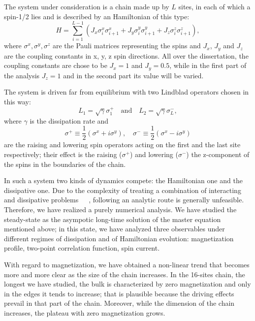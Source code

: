 \documentclass[12pt]{extarticle}
\begin{document}
The system under consideration is a chain made up by $L$ sites, in each of which a spin-1/2 lies and is described by an Hamiltonian of this type:
\begin{equation*}
    H = \sum_{i = 1}^{L-1} (J_x\sigma_i^x\sigma_{i+1}^x + J_y\sigma_i^y \sigma_{i+1}^y + J_z \sigma_i^z \sigma_{i+1}^z),
\end{equation*}
where $\sigma^x, \sigma^y, \sigma^z$ are the Pauli matrices representing the spins and $J_x$, $J_y$ and $J_z$ are the coupling constants in x, y, z spin directions. All over the dissertation, the coupling constants are chose to be $J_x = 1$ and $J_y = 0.5$, while in the first part of the analysis $J_z = 1$ and in the second part its value will be varied.

The system is driven far from equilibrium with two Lindblad operators chosen in this way:
\begin{equation*}
    L_1 = \sqrt{\gamma} \sigma_1^+ \quad \text{and} \quad L_2 =\sqrt{\gamma}\sigma_L^-,
\end{equation*}
where $\gamma$ is the dissipation rate and 
\begin{equation*}
    \sigma^+ \equiv \frac{1}{2}(\sigma^x + i\sigma^y), \quad \sigma^- \equiv \frac{1}{2}(\sigma^x - i\sigma^y)
\end{equation*}
are the raising and lowering spin operators acting on the first and the last site respectively; their effect is the raising ($\sigma^+$) and lowering ($\sigma^-$) the z-component of the spins in the boundaries of the chain. 


In such a system two kinds of dynamics compete: the Hamiltonian one and the dissipative one. Due to the complexity of treating a combination of interacting and dissipative problems~\cite{phase_trans_spin_system}~\cite{Lee_Haffner_Cross}~\cite{savona}, following an analytic route is generally unfeasible. Therefore, we have realized a purely numerical analysis. We have studied the steady-state as the asympotic long-time solution of the master equation mentioned above; in this state, we have analyzed three observables under different regimes of dissipation and of Hamiltonian evolution: magnetization profile, two-point correlation function, spin current. 

With regard to magnetization, we have obtained a non-linear trend that becomes more and more clear as the size of the chain increases. In the 16-sites chain, the longest we have studied, the bulk is characterized by zero magnetization and only in the edges it tends to increase; that is plausible because the driving effects prevail in that part of the chain. Moreover, while the dimension of the chain increases, the plateau with zero magnetization grows. 
\end{document}
